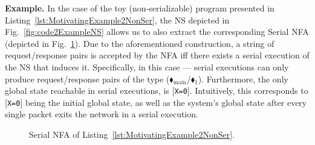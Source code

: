 \begin{enumerate}
	
\begin{tcolorbox}[colback=black!5!white, colframe=black, boxrule=1pt]
	\textbf{Example.} In the case of the toy (non-serializable) program presented in Listing~\ref{lst:MotivatingExample2NonSer}, the NS depicted in Fig.~\ref{fig:code2ExampleNS} allows us to also extract the corresponding Serial NFA (depicted in Fig.~\ref{fig:code2ExampleNFA}).
	Due to the aforementioned construction, a string of request/response pairs is accepted by the NFA iff there exists a serial execution of the NS that induces it.
%
Specifically, in this case --- serial executions can only produce request/response pairs of the type ({\color{ForestGreen}$\blacklozenge_\text{main}$/{\color{red}$\blacklozenge_1$}}). Furthermore, the only global state reachable in serial executions, is [\texttt{X=0}]. 
	Intuitively, this corresponds to [\texttt{X=0}] being the initial global state, as well as the system's global state after every single packet exits the network in a serial execution.
	\end{tcolorbox}
	\begin{figure}[!htbp]
		\centering
		
		
		\caption{Serial NFA of Listing~\ref{lst:MotivatingExample2NonSer}.}
		\label{fig:code2ExampleNFA}
	\end{figure}
	

\end{enumerate}
